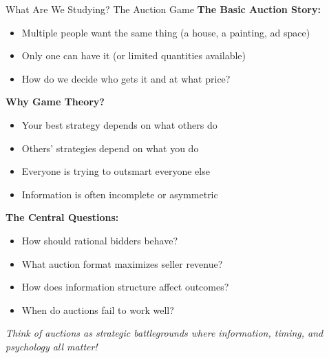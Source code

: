\documentclass[xcolor={x11names}]{beamer}
\begin{document}
\begin{frame}{What Are We Studying? The Auction Game}
\textbf{The Basic Auction Story:}
\begin{itemize}
  \item Multiple people want the same thing (a house, a painting, ad space)
  \item Only one can have it (or limited quantities available)
  \item How do we decide who gets it and at what price?
\end{itemize}

\textbf{Why Game Theory?}
\begin{itemize}
  \item Your best strategy depends on what others do
  \item Others' strategies depend on what you do
  \item Everyone is trying to outsmart everyone else
  \item Information is often incomplete or asymmetric
\end{itemize}

\textbf{The Central Questions:}
\begin{itemize}
  \item How should rational bidders behave?
  \item What auction format maximizes seller revenue?
  \item How does information structure affect outcomes?
  \item When do auctions fail to work well?
\end{itemize}

\textit{Think of auctions as strategic battlegrounds where information, timing, and psychology all matter!}
\end{frame}
\end{document}
